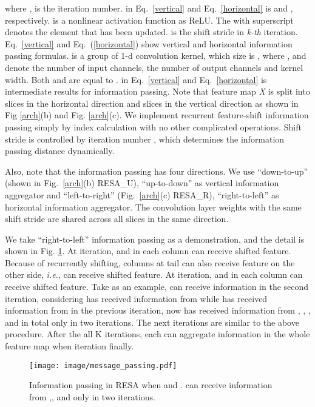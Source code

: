 \documentclass[letterpaper]{article} \usepackage{aaai21}  \usepackage{times}  \usepackage{helvet} \usepackage{courier}  \usepackage[hyphens]{url}  \usepackage{graphicx} \urlstyle{rm} \def\UrlFont{\rm}  \usepackage{natbib}  \usepackage{caption} \frenchspacing  \setlength{\pdfpagewidth}{8.5in}  \setlength{\pdfpageheight}{11in}  \usepackage{amsmath}
\begin{document}
where ,  is the iteration number.  in Eq.~\eqref{vertical} and  Eq.~\eqref{horizontal} is  and , respectively.  is a nonlinear activation function as ReLU. The  with superscript  denotes the element that has been updated.  is the shift stride in \textit{k-th} iteration. Eq.~\eqref{vertical} and  Eq.~(\ref{horizontal}) show vertical and horizontal information passing formulas.  is a group of 1-d convolution kernel, which size is , where ,  and  denote the number of input channels, the number of output channels and kernel width. Both  and  are equal to .  in Eq.~\eqref{vertical} and  Eq.~\eqref{horizontal} is intermediate results for information passing. Note that feature map \textit{X} is split into  slices in the horizontal direction and  slices in the vertical direction as shown in Fig \ref{arch}(b) and Fig. \ref{arch}(c). We implement recurrent feature-shift information passing simply by index calculation with no other complicated operations. Shift stride  is controlled by iteration number , which determines the information passing distance dynamically.

Also, note that the information passing has four directions. We use
``down-to-up'' (shown in Fig.~\ref{arch}(b) RESA\_U), ``up-to-down'' as vertical information aggregator and ``left-to-right'' (Fig.~\ref{arch}(c) RESA\_R), ``right-to-left'' as horizontal information aggregator. The convolution layer weights with the same shift stride are shared across all slices in the same direction.

We take ``right-to-left'' information passing as a demonstration, and the detail is shown in Fig. \ref{message_passing}. At  iteration,  and  in each column can receive  shifted feature. Because of recurrently shifting, columns at tail can also receive feature on the other side, \emph{i.e.},  can receive  shifted feature. At  iteration,  and  in each column can receive  shifted feature. Take  as an example,  can receive  information in the second iteration, considering  has received information from  while  has received information from  in the previous iteration, now  has received information from , , , and  in total only in two iterations. The next iterations are similar to the above procedure. After the all K iterations, each  can aggregate information in the whole feature map when iteration  finally. 

\begin{figure}[!t]
\centering
\texttt{[image: 
image/message\_passing.pdf]}
\caption{Information passing in RESA when  and .  can receive information from ,, and  only in two iterations.}
\label{message_passing}
\vspace{-10pt}
\end{figure}
\end{document}
